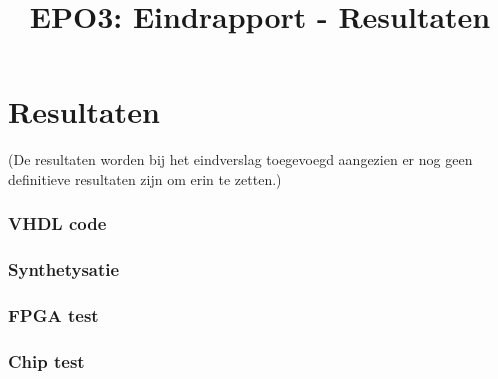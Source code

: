 \documentclass{scrartcl} %
\author{}
\title{EPO3: Eindrapport - Resultaten}
\begin{document}
\chapter{Resultaten}
\label{ch:resultaten}

(De resultaten worden bij het eindverslag toegevoegd aangezien er nog geen definitieve resultaten zijn om erin te zetten.)

\subsection{VHDL code}


\subsection{Synthetysatie}



\subsection{FPGA test}



\subsection{Chip test}
\end{document}
